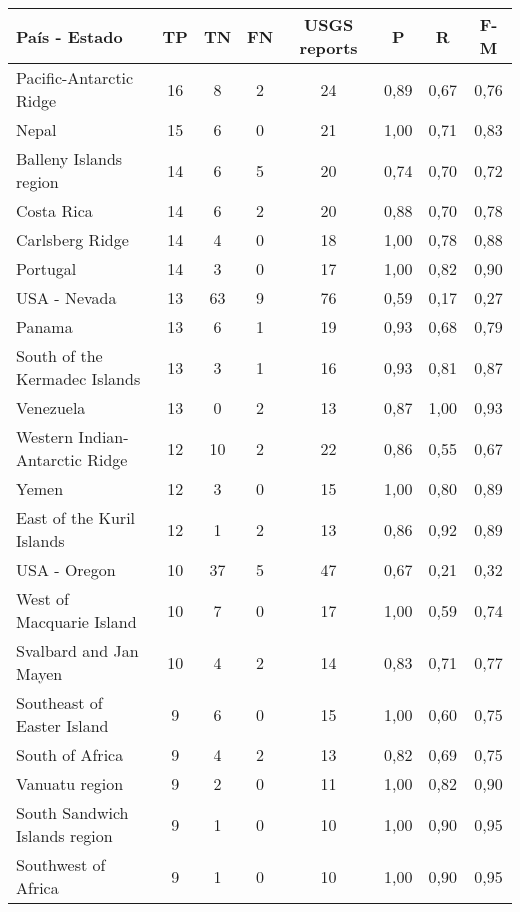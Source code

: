 {\small
\begin{table}[!ht]
\centering
  \begin{tabular}{|l|ccc|c|ccc|}
  \hline
  País - Estado & TP & TN & FN & USGS reports & P & R & F-M \\
  \hline \hline
Pacific-Antarctic Ridge	 & 16 	 & 8 	 & 2 	& 24	 & 0,89 &	0,67 &	0,76 \\ \hline
Nepal	 & 15 	 & 6 	 & 0   	& 21	 & 1,00 &	0,71 &	0,83 \\ \hline
Balleny Islands region	 & 14 	 & 6 	 & 5 	& 20	 & 0,74 &	0,70 &	0,72 \\ \hline
Costa Rica	 & 14 	 & 6 	 & 2 	& 20	 & 0,88 &	0,70 &	0,78 \\ \hline
Carlsberg Ridge	 & 14 	 & 4 	 & 0   	& 18	 & 1,00 &	0,78 &	0,88 \\ \hline
Portugal	 & 14 	 & 3 	 & 0   	& 17	 & 1,00 &	0,82 &	0,90 \\ \hline
USA - Nevada	 & 13 	 & 63 	 & 9 	& 76	 & 0,59 &	0,17 &	0,27 \\ \hline
Panama	 & 13 	 & 6 	 & 1 	& 19	 & 0,93 &	0,68 &	0,79 \\ \hline
South of the Kermadec Islands	 & 13 	 & 3 	 & 1 	& 16	 & 0,93 &	0,81 &	0,87 \\ \hline
Venezuela	 & 13 	 & 0   	 & 2 	& 13	 & 0,87 &	1,00 &	0,93 \\ \hline
Western Indian-Antarctic Ridge	 & 12 	 & 10 	 & 2 	& 22	 & 0,86 &	0,55 &	0,67 \\ \hline
Yemen	 & 12 	 & 3 	 & 0   	& 15	 & 1,00 &	0,80 &	0,89 \\ \hline
East of the Kuril Islands	 & 12 	 & 1 	 & 2 	& 13	 & 0,86 &	0,92 &	0,89 \\ \hline
USA - Oregon	 & 10 	 & 37 	 & 5 	& 47	 & 0,67 &	0,21 &	0,32 \\ \hline
West of Macquarie Island	 & 10 	 & 7 	 & 0   	& 17	 & 1,00 &	0,59 &	0,74 \\ \hline
Svalbard and Jan Mayen	 & 10 	 & 4 	 & 2 	& 14	 & 0,83 &	0,71 &	0,77 \\ \hline
Southeast of Easter Island	 & 9 	 & 6 	 & 0   	& 15	 & 1,00 &	0,60 &	0,75 \\ \hline
South of Africa	 & 9 	 & 4 	 & 2 	& 13	 & 0,82 &	0,69 &	0,75 \\ \hline
Vanuatu region	 & 9 	 & 2 	 & 0   	& 11	 & 1,00 &	0,82 &	0,90 \\ \hline
South Sandwich Islands region	 & 9 	 & 1 	 & 0   	& 10	 & 1,00 &	0,90 &	0,95 \\ \hline
Southwest of Africa	 & 9 	 & 1 	 & 0   	& 10	 & 1,00 &	0,90 &	0,95 \\ \hline

\end{tabular}
\end{table}}
